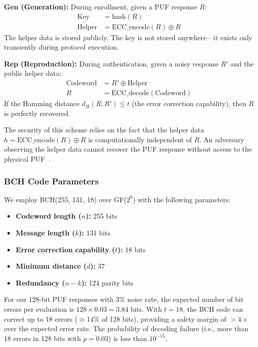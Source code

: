 \documentclass[11pt,a4paper]{article}
\begin{document}
\textbf{Gen (Generation):} During enrollment, given a PUF response $R$:
\begin{align}
\text{Key} &= \text{hash}(R) \\
\text{Helper} &= \text{ECC\_encode}(R) \oplus R
\end{align}
The helper data is stored publicly. The key is not stored anywhere---it exists only transiently during protocol execution.

\textbf{Rep (Reproduction):} During authentication, given a noisy response $R'$ and the public helper data:
\begin{align}
\text{Codeword} &= R' \oplus \text{Helper} \\
R &= \text{ECC\_decode}(\text{Codeword})
\end{align}
If the Hamming distance $d_H(R, R') \leq t$ (the error correction capability), then $R$ is perfectly recovered.

The security of this scheme relies on the fact that the helper data $h = \text{ECC\_encode}(R) \oplus R$ is computationally independent of $R$. An adversary observing the helper data cannot recover the PUF response without access to the physical PUF~\cite{helper_data_masking}.

\subsubsection{BCH Code Parameters}

We employ BCH(255, 131, 18) over GF($2^8$) with the following parameters:

\begin{itemize}[leftmargin=*]
    \item \textbf{Codeword length ($n$):} 255 bits
    \item \textbf{Message length ($k$):} 131 bits
    \item \textbf{Error correction capability ($t$):} 18 bits
    \item \textbf{Minimum distance ($d$):} 37
    \item \textbf{Redundancy ($n-k$):} 124 parity bits
\end{itemize}

For our 128-bit PUF responses with 3\% noise rate, the expected number of bit errors per evaluation is $128 \times 0.03 = 3.84$ bits. With $t = 18$, the BCH code can correct up to 18 errors ($\approx$14\% of 128 bits), providing a safety margin of $>4\times$ over the expected error rate. The probability of decoding failure (i.e., more than 18 errors in 128 bits with $p = 0.03$) is less than $10^{-15}$.
\end{document}
